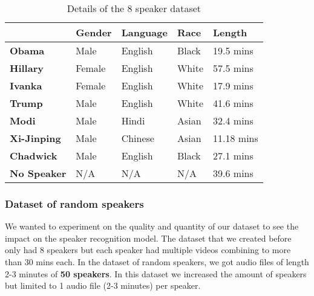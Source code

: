 \documentclass[10pt,twocolumn,letterpaper]{article}
\begin{document}
\begin{table}[h]
    \begin{tabular}{l|l|l|l|l|}
    \cline{2-5}
                                                    & \textbf{Gender} & \textbf{Language} & \textbf{Race} & \textbf{Length} \\ \hline
    \multicolumn{1}{|l|}{\textbf{Obama}}            & Male            & English           & Black         & 19.5 mins       \\ \hline
    \multicolumn{1}{|l|}{\textbf{Hillary}}          & Female          & English           & White         & 57.5 mins       \\ \hline
    \multicolumn{1}{|l|}{\textbf{Ivanka}}           & Female          & English           & White         & 17.9 mins       \\ \hline
    \multicolumn{1}{|l|}{\textbf{Trump}}            & Male            & English           & White         & 41.6 mins       \\ \hline
    \multicolumn{1}{|l|}{\textbf{Modi}}             & Male            & Hindi             & Asian         & 32.4 mins       \\ \hline
    \multicolumn{1}{|l|}{\textbf{Xi-Jinping}}       & Male            & Chinese           & Asian         & 11.18 mins      \\ \hline
    \multicolumn{1}{|l|}{\textbf{Chadwick}}         & Male            & English           & Black         & 27.1 mins       \\ \hline
    \multicolumn{1}{|l|}{\textbf{No Speaker}}       & N/A             & N/A               & N/A           & 39.6 mins       \\ \hline
    \end{tabular}
    \caption{Details of the 8 speaker dataset}
    \label{Dataset}
\end{table}


\subsubsection{Dataset of random speakers}

We wanted to experiment on the quality and quantity of our dataset to see the impact on the speaker recognition model. The dataset that we created before only had 8 speakers but each speaker had multiple videos combining to more than 30 mins each. In the dataset of random speakers, we got audio files of length 2-3 minutes of \textbf{50 speakers}. In this dataset we increased the amount of speakers but limited to 1 audio file (2-3 minutes) per speaker. 
\end{document}
